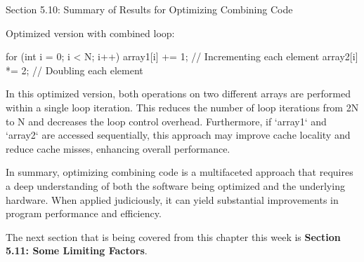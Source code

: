 \begin{notes}{Section 5.10: Summary of Results for Optimizing Combining Code}
\begin{highlight}
        Optimized version with combined loop:
    
    \begin{code}[C]
    for (int i = 0; i < N; i++) {
        array1[i] += 1;  // Incrementing each element
        array2[i] *= 2;  // Doubling each element
    }
    \end{code}
        In this optimized version, both operations on two different arrays are performed within a single loop iteration. This reduces the number of loop iterations from 2N to N and decreases the loop 
        control overhead. Furthermore, if `array1` and `array2` are accessed sequentially, this approach may improve cache locality and reduce cache misses, enhancing overall performance.
    \end{highlight}    
    
    In summary, optimizing combining code is a multifaceted approach that requires a deep understanding of both the software being optimized and the underlying hardware. When applied judiciously, it 
    can yield substantial improvements in program performance and efficiency.    
\end{notes}

The next section that is being covered from this chapter this week is \textbf{Section 5.11: Some Limiting Factors}.

